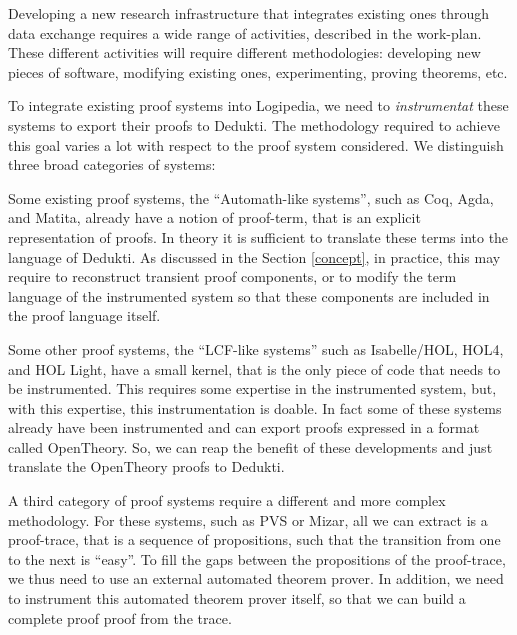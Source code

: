 Developing a new research infrastructure that integrates existing
ones through data exchange requires a wide range of activities,
described in the work-plan. These different activities will require
different methodologies: developing new pieces of software,
modifying existing ones, experimenting, proving theorems, etc.


To integrate existing proof systems into Logipedia, we need to
\emph{instrumentat} these systems to export their proofs to Dedukti. The
methodology required to achieve this goal varies a lot with respect to
the proof system considered. We distinguish three broad categories of
systems:

\begin{compactitem}
\item
Some existing proof systems, the ``Automath-like systems'', such as Coq, Agda, and
Matita, already have a notion of proof-term, that is an explicit
representation of proofs.  In theory it is sufficient to translate
these terms into the language of Dedukti.  As discussed in the Section
\ref{concept}, in practice, this may require to reconstruct transient
proof components, or to modify the term language of the instrumented
system so that these components are included in the proof language
itself.

\item
Some other proof systems, the ``LCF-like systems'' such as
Isabelle/HOL, HOL4, and HOL Light, have a small kernel, that is the
only piece of code that needs to be instrumented. This requires some
expertise in the instrumented system, but, with this expertise, this
instrumentation is doable. In fact some of these systems already have
been instrumented and can export proofs expressed in a format called
OpenTheory. So, we can reap the benefit of these developments and just
translate the OpenTheory proofs to Dedukti.

\item A third category of proof systems require a different and more
  complex methodology. For these systems, such as PVS or Mizar, all we
  can extract is a proof-trace, that is a sequence of propositions,
  such that the transition from one to the next is ``easy''.
  To fill the gaps between the propositions of the proof-trace,
  we thus need to use an external automated theorem prover. In
  addition, we need to instrument this automated theorem prover
  itself, so that we can build a complete proof proof from the trace.
\end{compactitem}

